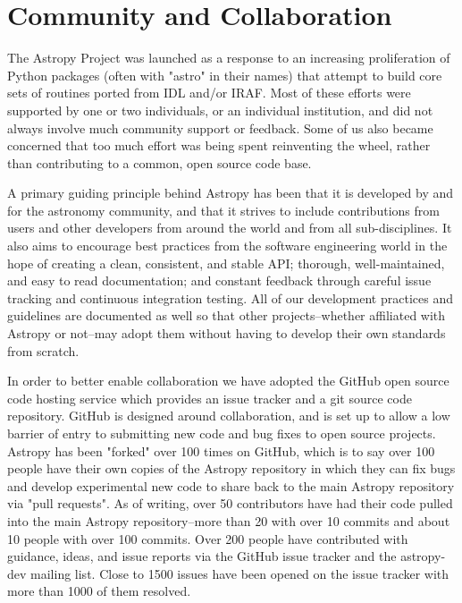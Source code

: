 \documentclass[11pt,twoside]{article}
\begin{document}
\section{Community and Collaboration}

The Astropy Project was launched as a response to an increasing proliferation
of Python packages (often with "astro" in their names) that attempt to build
core sets of routines ported from IDL and/or IRAF.  Most of these efforts were
supported by one or two individuals, or an individual institution, and did not
always involve much community support or feedback.  Some of us also became
concerned that too much effort was being spent reinventing the wheel, rather
than contributing to a common, open source code base.

A primary guiding principle behind Astropy has been that it is developed by and
for the astronomy community, and that it strives to include contributions from
users and other developers from around the world and from all sub-disciplines.
It also aims to encourage best practices from the software engineering world in
the hope of creating a clean, consistent, and stable API; thorough,
well-maintained, and easy to read documentation; and constant feedback through
careful issue tracking and continuous integration testing.  All of our
development practices and guidelines are documented as well so that other
projects--whether affiliated with Astropy or not--may adopt them without having
to develop their own standards from scratch.

In order to better enable collaboration we have adopted the GitHub open source
code hosting service which provides an issue tracker and a git source code
repository.  GitHub is designed around collaboration, and is set up to allow a
low barrier of entry to submitting new code and bug fixes to open source
projects.  Astropy has been "forked" over 100 times on GitHub, which is to say
over 100 people have their own copies of the Astropy repository in which they
can fix bugs and develop experimental new code to share back to the main
Astropy repository via "pull requests".  As of writing, over 50 contributors
have had their code pulled into the main Astropy repository--more than 20 with
over 10 commits and about 10 people with over 100 commits.  Over 200 people
have contributed with guidance, ideas, and issue reports via the GitHub issue
tracker and the astropy-dev mailing list.  Close to 1500 issues have been
opened on the issue tracker with more than 1000 of them resolved.
\end{document}
